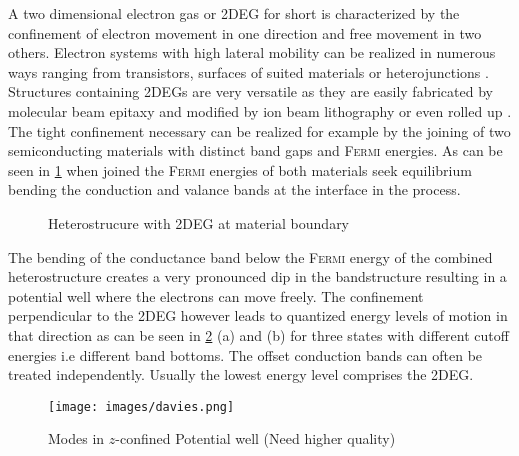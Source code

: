 A two dimensional electron gas or 2DEG for short is characterized by the confinement of electron movement in one direction and free movement in two others. 
Electron systems with high lateral mobility can be realized in numerous ways ranging from transistors, surfaces of suited materials \cite{PhysRevLett.12.271} or heterojunctions \cite{JVSTB.4.853}. Structures containing 2DEGs are very versatile as they are easily fabricated by molecular beam epitaxy and modified by ion beam lithography \cite{Ingram1995}\cite{Nowack2009Thesis} or even rolled up \cite{Vorob'ev2004171}.
The tight confinement necessary can be realized for example by the joining of two semiconducting materials with distinct band gaps and \textsc{Fermi} energies. As can be seen in \cref{fig:hetero2deg} when joined the \textsc{Fermi} energies of both materials seek equilibrium bending the conduction and valance bands at the interface in the process.
\begin{figure}[h]
\centering
{} \quad\quad
{} \quad\quad
{}
\caption{Heterostrucure with 2DEG at material boundary}
\label{fig:hetero2deg}
\end{figure}
The bending of the conductance band below the \textsc{Fermi} energy of the combined heterostructure creates a very pronounced dip in the bandstructure resulting in a potential well where the electrons can move freely. The confinement perpendicular to the 2DEG however leads to quantized energy levels of motion in that direction as can be seen in \cref{fig:potentialwell} (a) and (b) for three states with different cutoff energies i.e different band bottoms. The offset conduction bands can often be treated independently. Usually the lowest energy level comprises the 2DEG\cite{Datta1997}.
\begin{figure}
\centering
\texttt{[image: images/davies.png]}
\caption{Modes in $z$-confined Potential well (Need higher quality)}
\label{fig:potentialwell}
\end{figure}
